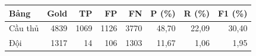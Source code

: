 \begin{tabularx}{\linewidth}{@{}Yrrrrrrr@{}}
\toprule
\textbf{Bảng} & \textbf{Gold} & \textbf{TP} & \textbf{FP} & \textbf{FN} & \textbf{P (\%)} & \textbf{R (\%)} & \textbf{F1 (\%)} \\\midrule
Cầu thủ & 4839 & 1069 & 1126 & 3770 & 48,70 & 22,09 & 30,40 \\
Đội & 1317 & 14 & 106 & 1303 & 11,67 & 1,06 & 1,95 \\
\bottomrule
\end{tabularx}

